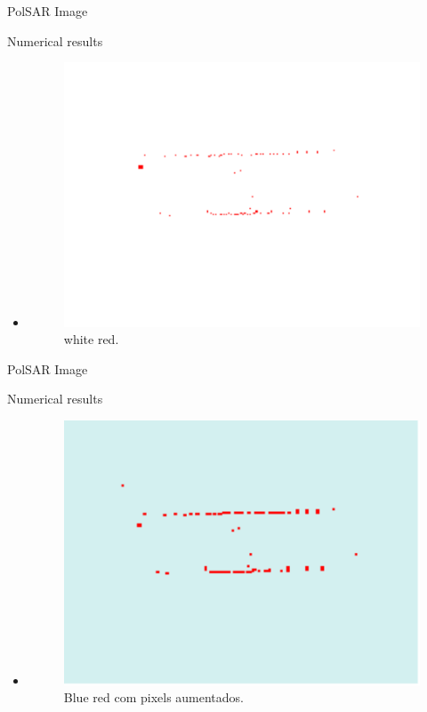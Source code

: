 \documentclass[10pt]{beamer}
\begin{document}
\begin{frame}[fragile]{PolSAR Image}
\begin{alertblock}{Numerical results}
\begin{itemize}
	\item 
	\begin{figure}[hbt]
\centering
	\includegraphics[width=.5\linewidth]{flevoland_fusao_roc_crop_teste_white_red}
	\caption{white red.}
\label{flevoland_radial_4look}
\end{figure}
\end{itemize}
\end{alertblock}
\end{frame}

\begin{frame}[fragile]{PolSAR Image}
\begin{alertblock}{Numerical results}
\begin{itemize}
	\item 
	\begin{figure}[hbt]
\centering
	\includegraphics[width=.5\linewidth]{flevoland_fusao_roc_crop_teste_blue_red_pixel_aumen}
	\caption{Blue red com pixels aumentados.}
\label{flevoland_radial_4look}
\end{figure}
\end{itemize}
\end{alertblock}
\end{frame}
\end{document}
